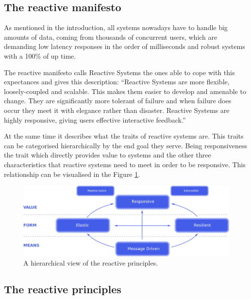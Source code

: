\documentclass[../main.tex]{subfiles}
\begin{document}
\subsection{The reactive manifesto}

As mentioned in the introduction, all 
systems nowadays have to handle big amounts of data, coming from thousands of
concurrent users, which are demanding low latency responses in the order of
milliseconds and robust systems with a 100\% of up time.


The reactive manifesto \autocite{2014TheManifesto} calls Reactive Systems the
ones able to cope with this expectances and gives this description: ``Reactive
Systems are more flexible, loosely-coupled and scalable. This makes them easier
to develop and amenable to change. They are significantly more tolerant of
failure and when failure does occur they meet it with elegance rather than
disaster. Reactive Systems are highly responsive, giving users effective
interactive feedback.''


At the same time it describes what the traits of reactive systems are. 
This
traits can be categorised hierarchically by the end goal they serve. Being
responsiveness the trait which directly provides value to systems and the other
three characteristics that reactive systems need to meet in order to be
responsive. 
This relationship can be visualised in the Figure
\ref{fig:reactive}.

\begin{figure}[ht] \centering
\includegraphics[width=\textwidth]{images/reactive-traits.png}
    \caption{A hierarchical view of the reactive principles.}
    \label{fig:reactive}
\end{figure}

\subsection{The reactive principles}
\end{document}
